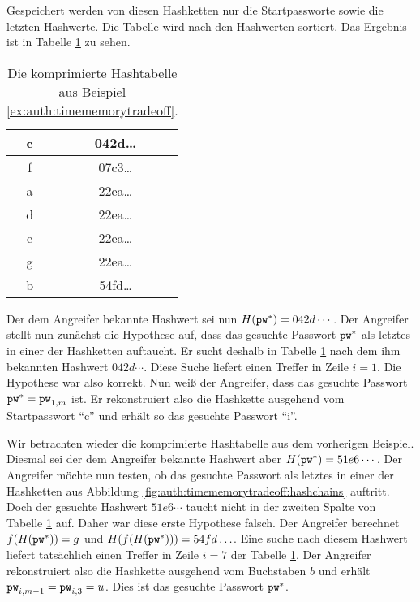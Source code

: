 \begin{beispiel}
Gespeichert werden von diesen Hashketten nur die Startpassworte sowie die letzten Hashwerte. Die Tabelle wird nach den Hashwerten sortiert. Das Ergebnis ist in Tabelle \ref{table:auth:timememorytradeoff:hashtable} zu sehen.

\begin{table}[h]
	\begin{center}
		\begin{tabular}{|c|c|}
			\hline
			c & 042d\ldots\\\hline
			f & 07c3\ldots\\\hline
			a & 22ea\ldots\\\hline
			d & 22ea\ldots\\\hline
			e & 22ea\ldots\\\hline
			g & 22ea\ldots\\\hline
			b & 54fd\ldots\\\hline
		\end{tabular}
	\end{center}
	\caption{Die komprimierte Hashtabelle aus Beispiel \ref{ex:auth:timememorytradeoff}.}
	\label{table:auth:timememorytradeoff:hashtable}
\end{table}

Der dem Angreifer bekannte Hashwert sei nun $H(\texttt{pw}^*) = 042d\cdots$.
Der Angreifer stellt nun zunächst die Hypothese auf, dass das gesuchte Passwort $\texttt{pw}^*$ als letztes in einer der Hashketten auftaucht. Er sucht deshalb in Tabelle \ref{table:auth:timememorytradeoff:hashtable} nach dem ihm bekannten Hashwert $042d\cdots$. Diese Suche liefert einen Treffer in Zeile $i = 1$. Die Hypothese war also korrekt. Nun weiß der Angreifer, dass das gesuchte Passwort $\texttt{pw}^* = \texttt{pw}_{1,m}$ ist. Er rekonstruiert also die Hashkette ausgehend vom Startpasswort "`c"' und erhält so das gesuchte Passwort "`i"'.\\
\end{beispiel}

\begin{beispiel}
Wir betrachten wieder die komprimierte Hashtabelle aus dem vorherigen Beispiel. Diesmal sei der dem Angreifer bekannte Hashwert aber $H(\texttt{pw}^*) = 51e6\cdots$.
Der Angreifer möchte nun testen, ob das gesuchte Passwort als letztes in einer der Hashketten aus Abbildung \ref{fig:auth:timememorytradeoff:hashchains} auftritt.
Doch der gesuchte Hashwert $51e6\cdots$ taucht nicht in der zweiten Spalte von Tabelle \ref{table:auth:timememorytradeoff:hashtable} auf.
Daher war diese erste Hypothese falsch. Der Angreifer berechnet $f(H(\texttt{pw}^*)) = g$ und $H(f(H(\texttt{pw}^*))) = 54fd\ldots$.
Eine suche nach diesem Hashwert liefert tatsächlich einen Treffer in Zeile $i = 7$ der Tabelle \ref{table:auth:timememorytradeoff:hashtable}.
Der Angreifer rekonstruiert also die Hashkette ausgehend vom Buchstaben $b$ und erhält $\texttt{pw}_{i,m-1} = \texttt{pw}_{i,3} = u$.
Dies ist das gesuchte Passwort $\texttt{pw}^*$.\\
\end{beispiel}

